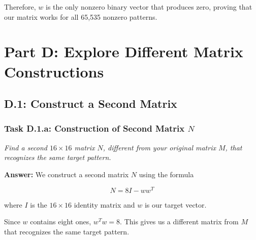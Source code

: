 \documentclass[11pt]{article}
\begin{document}
Therefore, $w$ is the only nonzero binary vector that produces zero, proving that our matrix works for all 65,535 nonzero patterns.

\newpage

\section*{Part D: Explore Different Matrix Constructions}

\subsection*{D.1: Construct a Second Matrix}

\subsubsection*{Task D.1.a: Construction of Second Matrix $N$}
\textit{Find a second $16 \times 16$ matrix $N$, different from your original matrix $M$, that recognizes the same target pattern.}

\vspace{0.4em}
\textbf{Answer:} 
We construct a second matrix $N$ using the formula

\[
N = 8I - ww^T
\]

where $I$ is the $16 \times 16$ identity matrix and
$w$ is our target vector.

Since $w$ contains eight ones, $w^Tw = 8$.
This gives us a different matrix from $M$ that
recognizes the same target pattern.

\begin{center}
\end{center}
\end{document}

